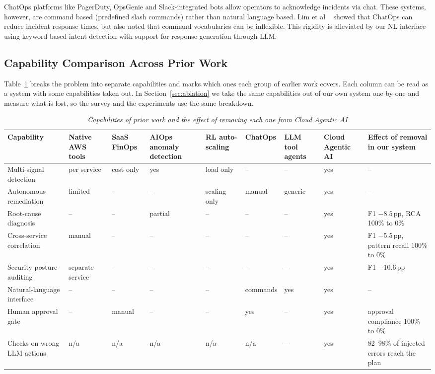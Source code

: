 \documentclass{ieeeaccess}
\begin{document}
ChatOps platforms like PagerDuty, OpsGenie and Slack-integrated bots allow operators to acknowledge incidents via chat. These systems, however, are command based (predefined slash commands) rather than natural language based. Lim et al ~\cite{lim2022chatops} showed that ChatOps can reduce incident response times, but also noted that command vocabularies can be inflexible. This rigidity is alleviated by our NL interface using keyword-based intent detection with support for response generation through LLM.

\subsection{Capability Comparison Across Prior Work}
\label{sec:related-ablation}

Table~\ref{tab:litablation} breaks the problem into separate capabilities and
marks which ones each group of earlier work covers. Each column can be read as
a system with some capabilities taken out. In Section~\ref{sec:ablation} we
take the same capabilities out of our own system one by one and measure what
is lost, so the survey and the experiments use the same breakdown.

\begin{table}[t]
\caption{\textit{Capabilities of prior work and the effect of removing each one from Cloud Agentic AI}}
\centering
\setlength{\tabcolsep}{3pt}
\begin{tabular}{p{2.6cm} p{1.6cm} p{1.6cm} p{1.6cm} p{1.5cm} p{1.4cm} p{1.5cm} p{1.2cm} p{2.8cm}}
\toprule
\textbf{Capability} & \textbf{Native AWS tools} & \textbf{SaaS FinOps} & \textbf{AIOps anomaly detection \cite{chen2020aiops,du2017deeplog}} & \textbf{RL auto-scaling \cite{chen2018rl,arabnejad2017predictive}} & \textbf{ChatOps \cite{lim2022chatops}} & \textbf{LLM tool agents \cite{yao2023react,schick2023toolformer}} & \textbf{Cloud Agentic AI} & \textbf{Effect of removal in our system} \\
\midrule
Multi-signal detection      & per service & cost only & yes & load only & -- & -- & yes & -- \\
Autonomous remediation      & limited & -- & -- & scaling only & manual & generic & yes & -- \\
Root-cause diagnosis        & -- & -- & partial & -- & -- & -- & yes & F1 $-8.5$\,pp, RCA 100\% to 0\% \\
Cross-service correlation   & manual & -- & -- & -- & -- & -- & yes & F1 $-5.5$\,pp, pattern recall 100\% to 0\% \\
Security posture auditing   & separate service & -- & -- & -- & -- & -- & yes & F1 $-10.6$\,pp \\
Natural-language interface  & -- & -- & -- & -- & commands & yes & yes & -- \\
Human approval gate         & -- & manual & -- & -- & yes & -- & yes & approval compliance 100\% to 0\% \\
Checks on wrong LLM actions & n/a & n/a & n/a & n/a & n/a & -- & yes & 82--98\% of injected errors reach the plan \\
\bottomrule
\end{tabular}
\label{tab:litablation}
\end{table}
\end{document}
